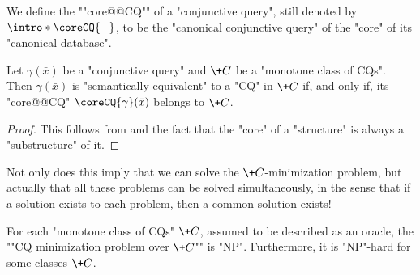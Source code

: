 We define the ""core@@CQ"" of a "conjunctive query", still denoted by $\intro*\coreCQ{-}$,
to be the "canonical conjunctive query" of the "core" of its "canonical database".
\begin{proposition}
	\AP\label{prop:minimization-CQ}
	Let $\gamma(\bar x)$ be a "conjunctive query" and $\+C$ be
	a "monotone class of CQs". Then $\gamma(\bar x)$ is "semantically equivalent"
	to a "CQ" in $\+C$ if, and only if, its "core@@CQ" $\coreCQ{\gamma}(\bar x)$
	belongs to $\+C$.
\end{proposition}

\begin{proof}
	This follows from 
	and the fact that the "core" of a "structure" is always
	a "substructure" of it.
\end{proof}

Not only does this imply that we can solve the $\+C$-minimization problem,
but actually that all these problems can be solved simultaneously,
in the sense that if a solution exists to each problem, then a common solution exists!


\begin{corollary}
	\label{coro:decision-minimization-cq}
	For each "monotone class of CQs" $\+C$, assumed to be described as an oracle,
	the ""CQ minimization problem over $\+C$"" is "NP".
	Furthermore, it is "NP"-hard for some classes $\+C$.
\end{corollary}

